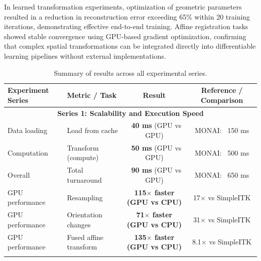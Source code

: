 \documentclass[a4paper,10pt]{elsarticle}
\begin{document}
In learned transformation experiments, optimization of geometric parameters resulted in a reduction in reconstruction error exceeding 65\% within 20 training iterations, demonstrating effective end-to-end training. Affine registration tasks showed stable convergence using GPU-based gradient optimization, confirming that complex spatial transformations can be integrated directly into differentiable learning pipelines without external implementations.


 
\begin{table}[H]
\centering
\caption{Summary of results across all experimental series.}
\label{tab:all_results}
\renewcommand{\arraystretch}{1.2}
\begin{tabular}{|l|l|c|c|}
\hline
\textbf{Experiment Series} & \textbf{Metric / Task} & \textbf{Result} & \textbf{Reference / Comparison} \\
\hline

\multicolumn{4}{|c|}{\textbf{Series 1: Scalability and Execution Speed}} \\
\hline
Data loading & Load from cache & \textbf{~40 ms} (GPU vs GPU)& MONAI: ~150 ms \\
Computation & Transform (compute) & \textbf{~50 ms} (GPU vs GPU)& MONAI: ~500 ms\\
Overall & Total turnaround & \textbf{~90 ms} (GPU vs GPU)& MONAI: ~650 ms\\
GPU performance & Resampling & \textbf{115$\times$ faster (GPU vs CPU)} & 17$\times$ vs SimpleITK \\
GPU performance & Orientation changes & \textbf{71$\times$ faster (GPU vs CPU)} & 31$\times$ vs SimpleITK \\
GPU performance & Fused affine transform & \textbf{135$\times$ faster (GPU vs CPU)} & 8.1$\times$ vs SimpleITK \\
& & & \\
\hline


\end{tabular}
\end{table}
\end{document}
